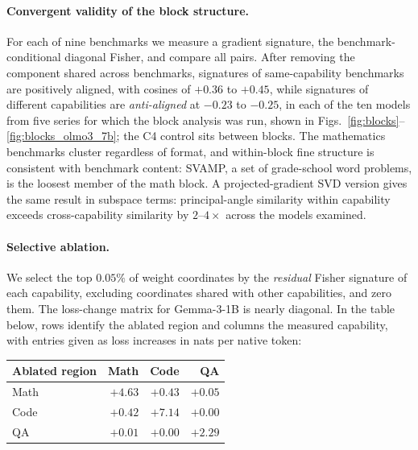 \paragraph{Convergent validity of the block structure.} For each of nine
benchmarks we measure a gradient signature, the benchmark-conditional diagonal Fisher, and compare all pairs. After removing the component
shared across benchmarks, signatures of same-capability benchmarks are
positively aligned, with cosines of $+0.36$ to $+0.45$, while signatures of different capabilities are \emph{anti-aligned} at $-0.23$ to $-0.25$,
in each of the ten models from five series for which the block analysis was run, shown in Figs.~\ref{fig:blocks}--\ref{fig:blocks_olmo3_7b}; the C4 control sits between blocks. The
mathematics benchmarks cluster regardless of format, and within-block
fine structure is consistent with benchmark content: SVAMP, a set of grade-school word problems, is the loosest member of the math block. A projected-gradient SVD
version gives the same result in subspace terms: principal-angle
similarity within capability exceeds cross-capability similarity by
$2$--$4\times$ across the models examined.

\paragraph{Selective ablation.} We
select the top $0.05\%$ of weight coordinates by the \emph{residual}
Fisher signature of each capability, excluding coordinates shared with other capabilities, and zero them. The loss-change matrix for Gemma-3-1B is nearly diagonal. In the table below, rows identify the ablated
region and columns the measured capability, with entries given as loss increases in nats per native token:

\begin{center}
\small
\begin{tabular*}{\textwidth}{@{\extracolsep{\fill}}lrrr@{}}
\toprule
Ablated region & Math & Code & QA \\
\midrule
Math & $\mathbf{+4.63}$ & $+0.43$ & $+0.05$ \\
Code & $+0.42$ & $\mathbf{+7.14}$ & $+0.00$ \\
QA   & $+0.01$ & $+0.00$ & $\mathbf{+2.29}$ \\
\bottomrule
\end{tabular*}
\end{center}

